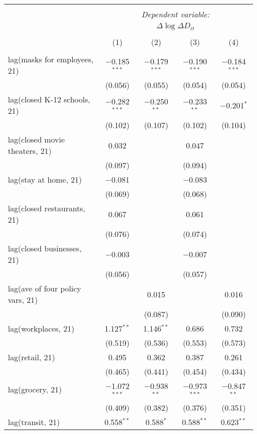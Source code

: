 \begin{tabular}{@{\extracolsep{1pt}}lcccc} 
\\[-1.8ex]\hline 
\hline \\[-1.8ex] 
 & \multicolumn{4}{c}{\textit{Dependent variable:}} \\ 
\cline{2-5} 
 & \multicolumn{4}{c}{$\Delta \log \Delta D_{it}$} \\ 
\\[-1.8ex] & (1) & (2) & (3) & (4)\\ 
\hline \\[-1.8ex] 
 lag(masks for employees, 21) & $-$0.185$^{***}$ & $-$0.179$^{***}$ & $-$0.190$^{***}$ & $-$0.184$^{***}$ \\ 
  & (0.056) & (0.055) & (0.054) & (0.054) \\ 
  lag(closed K-12 schools, 21) & $-$0.282$^{***}$ & $-$0.250$^{**}$ & $-$0.233$^{**}$ & $-$0.201$^{*}$ \\ 
  & (0.102) & (0.107) & (0.102) & (0.104) \\ 
  lag(closed movie theaters, 21) & 0.032 &  & 0.047 &  \\ 
  & (0.097) &  & (0.094) &  \\ 
  lag(stay at home, 21) & $-$0.081 &  & $-$0.083 &  \\ 
  & (0.069) &  & (0.068) &  \\ 
  lag(closed restaurants, 21) & 0.067 &  & 0.061 &  \\ 
  & (0.076) &  & (0.074) &  \\ 
  lag(closed businesses, 21) & $-$0.003 &  & $-$0.007 &  \\ 
  & (0.056) &  & (0.057) &  \\ 
  lag(ave of four policy vars, 21) &  & 0.015 &  & 0.016 \\ 
  &  & (0.087) &  & (0.090) \\ 
  lag(workplaces, 21) & 1.127$^{**}$ & 1.146$^{**}$ & 0.686 & 0.732 \\ 
  & (0.519) & (0.536) & (0.553) & (0.573) \\ 
  lag(retail, 21) & 0.495 & 0.362 & 0.387 & 0.261 \\ 
  & (0.465) & (0.441) & (0.454) & (0.434) \\ 
  lag(grocery, 21) & $-$1.072$^{***}$ & $-$0.938$^{**}$ & $-$0.973$^{***}$ & $-$0.847$^{**}$ \\ 
  & (0.409) & (0.382) & (0.376) & (0.351) \\ 
  lag(transit, 21) & 0.558$^{**}$ & 0.588$^{*}$ & 0.588$^{**}$ & 0.623$^{**}$ \\ 

\end{tabular}
